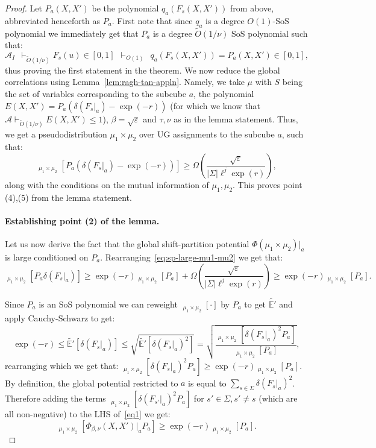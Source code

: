 \documentclass[11pt]{article}
\DeclareMathOperator*{\pE}{\widetilde{\mathbb{E}}}
\def \cA {\mathcal{A}}
\def \tO {\widetilde{O}}
\def \eps {{\varepsilon}}
\theoremstyle{definition}
\begin{document}
\begin{proof}
Let $P_a(X,X')$ be the polynomial $q_a(F_s(X,X'))$ from above, abbreviated henceforth as $P_a$. First note that since $q_a$ is a degree $O(1)$-SoS polynomial we immediately get that $P_a$ is a degree $\widetilde{O}(1/\nu)$ SoS polynomial such that:
\[\cA_I ~~ \vdash_{\widetilde{O}(1/\nu)} F_s(u) \in [0,1] ~~\vdash_{O(1)} ~~ q_a(F_s(X,X')) = P_a(X,X') \in [0,1],\]
thus proving the first statement in the theorem.
We now reduce the global correlations using Lemma~\ref{lem:ragh-tan-appln}. 
Namely, we take $\mu$ with $S$ being the set of variables corresponding to the subcube $a$, the polynomial $E(X,X') = P_a(\delta(F_s|_a) - \exp(-r))$ (for which we know that $\cA \vdash_{\tO(1/\nu)} E(X,X') \leq 1$), $\beta = \sqrt{\eps}$ and $\tau,\nu$ as in the lemma statement. Thus, we get a 
pseudodistribution $\mu_1 \times \mu_2$ over UG assignments to the subcube $a$, such that: 
\begin{equation}\label{eq:sp-large-mu1-mu2}
\pE_{\mu_1 \times \mu_2}[P_a(\delta(F_s|_a) - \exp(-r))] \geq \Omega\left(\frac{\sqrt{\eps}}{|\Sigma|\ell^{j}\exp(r)}\right),
\end{equation}
 along with the conditions on the mutual information of $\mu_1,\mu_2$. 
This proves point (4),(5) from the lemma statement. 

\paragraph{Establishing point (2) of the lemma.}
Let us now derive the fact that the global shift-partition potential $\Phi(\mu_1 \times \mu_2)|_a$ is large conditioned on $P_a$.  
Rearranging~\eqref{eq:sp-large-mu1-mu2} we get that:
\begin{equation}\label{eq1}
    \pE_{\mu_1 \times \mu_2}[P_{a}\delta(F_s|_a)] \geq \exp(-r)\pE_{\mu_1 \times \mu_2}[P_a] + \Omega\left(\frac{\sqrt{\eps}}{|\Sigma|\ell^{j}\exp(r)}\right) \geq \exp(-r) \pE_{\mu_1 \times \mu_2}[P_a].
\end{equation}


Since $P_a$ is an SoS polynomial we can reweight $\pE_{\mu_1 \times \mu_2}[\cdot]$ by $P_a$ to get $\widetilde{\mathbb{E}'}$ and apply Cauchy-Schwarz to get:
\[\exp(-r) \leq \widetilde{\mathbb{E}'}[\delta(F_s|_a)] \leq \sqrt{\widetilde{\mathbb{E}'}[\delta(F_s|_a)^2]} = 
\sqrt{\frac{\pE_{\mu_1 \times \mu_2}[\delta(F_s|_a)^2 P_a]}{\pE_{\mu_1 \times \mu_2}[P_a]}},\]
rearranging which we get that: $\pE_{\mu_1 \times \mu_2}[\delta(F_s|_a)^2P_a] \geq \exp(-r)\pE_{\mu_1 \times \mu_2}[P_a]$. By definition, the global potential restricted to $a$ is equal to $\sum_{s \in \Sigma} \delta(F_s|_a)^2$. Therefore adding the terms $\pE_{\mu_1 \times \mu_2}[\delta(F_{s'}|_a)^2 P_a]$ for $s' \in \Sigma, s' \neq s$ (which are all non-negative) to the LHS of~\eqref{eq1} we get:
\begin{equation}\label{eq:global-large}
\pE_{\mu_1 \times \mu_2}[\Phi_{\beta,\nu}(X,X')|_a P_a] \geq \exp(-r)\pE_{\mu_1 \times \mu_2}[P_a].
\end{equation}


\end{proof}
\end{document}
